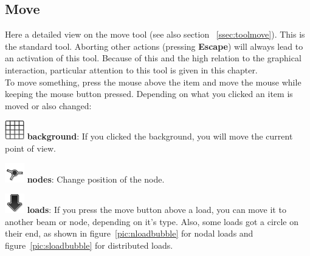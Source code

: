 \documentclass[a4paper,11pt]{report}
\begin{document}
\subsection{Move}
Here a detailed view on the move tool (see also section ~\ref{ssec:toolmove}). This is the standard tool. Aborting other actions (pressing \textbf{Escape}) will always lead to an activation of this tool. Because of this and the high relation to the graphical interaction, particular attention to this tool is given in this chapter.\\
To move something, press the mouse above the item and move the mouse while keeping the mouse button pressed. Depending on what you clicked an item is moved or also changed:
\begin{trivlist}
	\leftskip=1cm
	\item[]\includegraphics[scale = 0.5]{../../icons/grid.png} \textbf{background}: If you clicked the background, you will move the current point of view.
	\item[] \includegraphics[scale = 0.5]{../../icons/node.png} \textbf{nodes}: Change position of the node. 
	\item[] \includegraphics[scale = 0.5]{../../icons/load.png} \textbf{loads}: If you press the move button above a load, you can move it to another beam or node, depending on it's type. Also, some loads got a circle on their end, as shown in figure~\ref{pic:nloadbubble} for nodal loads and figure~\ref{pic:sloadbubble} for distributed loads.
\end{trivlist}
\end{document}
